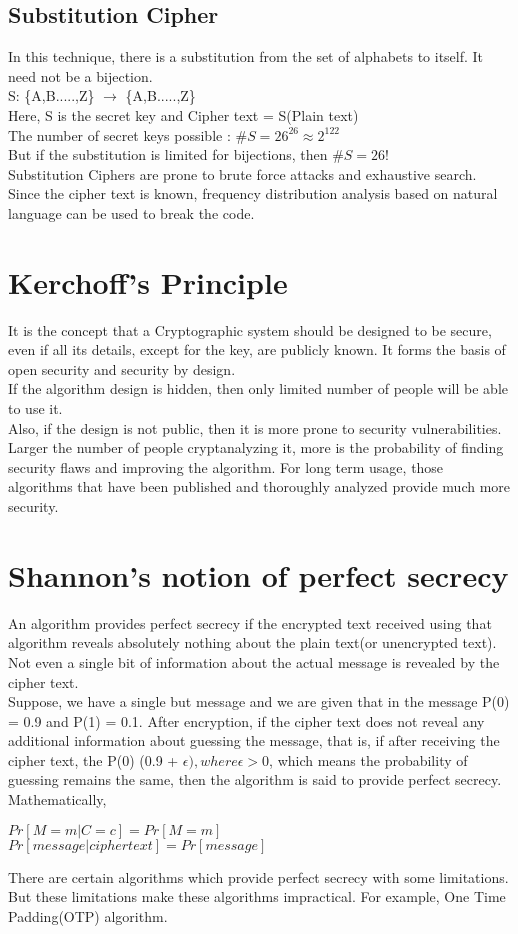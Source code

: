 \documentclass[11pt]{article}
\begin{document}
\subsection{Substitution Cipher}
In this technique, there is a substitution from the set of alphabets to itself. It need not be a bijection. \\
S: \{A,B.....,Z\} $\rightarrow$ \{A,B.....,Z\} \\
Here, S is the secret key and Cipher text = S(Plain text)\\
The number of secret keys possible : $\#S = 26^{26} \approx 2^{122}$\\
But if the substitution is limited for bijections, then $\#S = 26!$\\
Substitution Ciphers are prone to brute force attacks and exhaustive search. Since the cipher text is known, frequency distribution analysis based on natural language can be used to break the code.
\section{Kerchoff's Principle}
It is the concept that a Cryptographic system should be designed to be secure, even if all its details, except for the key, are publicly known. It forms the basis of open security and security by design.\\
If the algorithm design is hidden, then only limited number of people will be able to use it.\\
Also, if the design is not public, then it is more prone to security vulnerabilities. Larger the number of people cryptanalyzing it, more is the probability of finding security flaws and improving the algorithm. For long term usage, those algorithms that have been published and thoroughly analyzed provide much more security.
\section{Shannon's notion of perfect secrecy}
An algorithm provides perfect secrecy if the encrypted text received using that algorithm reveals absolutely nothing about the plain text(or unencrypted text). Not even a single bit of information about the actual message is revealed by the cipher text.  \\
Suppose, we have a single but message and we are given that in the message P(0) = 0.9 and P(1) = 0.1. After encryption, if the cipher text does not reveal any additional information about guessing the message, that is, if after receiving the cipher text, the P(0) \neq (0.9 + $\epsilon), where \epsilon > 0 $, which means the probability of guessing remains the same, then the algorithm is said to provide perfect secrecy.\\
Mathematically,
\begin{center}
    $Pr[M=m|C=c] = Pr[M=m]$\\
    $Pr[message | cipher text] = Pr[message]$
\end{center}
There are certain algorithms which provide perfect secrecy with some limitations. But these limitations make these algorithms impractical. For example, One Time Padding(OTP) algorithm.
\end{document}
